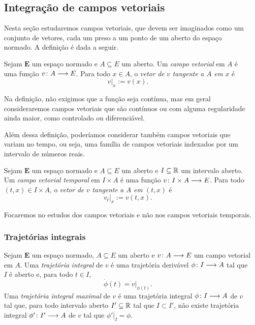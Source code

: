 \subsection{Integração de campos vetoriais}

Nesta seção estudaremos campos vetoriais, que devem ser imaginados como um conjunto de vetores, cada um preso a um ponto de um aberto do espaço normado. A definição é dada a seguir.

\begin{definition}
Sejam $\bm E$ um espaço normado e $A \subseteq E$ um aberto. Um \emph{campo vetorial} em $A$ é uma função $v\colon \allowbreak A \longrightarrow E$. Para todo $x \in A$, o \emph{vetor de $v$ tangente a $A$ em $x$} é
	\begin{equation*}
	v|_x := v(x).
	\end{equation*}
\end{definition}

Na definição, não exigimos que a função seja contínua, mas em geral consideraremos campos vetoriais que são contínuos ou com alguma regularidade ainda maior, como controlado ou diferenciável.


Além dessa definição, poderíamos considerar também campos vetoriais que variam no tempo, ou seja, uma família de campos vetoriais indexados por um intervalo de números reais.

\begin{definition}
Sejam $\bm E$ um espaço normado e $A \subseteq E$ um aberto e $I \subseteq \mathbb{R}$ um intervalo aberto. Um \emph{campo vetorial temporal} em $I \times A$ é uma função $v\colon \allowbreak I \times A \longrightarrow E$. Para todo $(t,x) \in I \times A$, o \emph{vetor de $v$ tangente a $A$ em $(t,x)$} é
	\begin{equation*}
	v_t|_x := v(t,x).
	\end{equation*}
\end{definition}

Focaremos no estudos dos campos vetoriais e não nos campos vetoriais temporais.


\subsubsection{Trajetórias integrais}

\begin{definition}
Sejam $\bm E$ um espaço normado, $A \subseteq E$ um aberto e $v\colon \allowbreak A \longrightarrow E$ um campo vetorial em $A$. Uma \emph{trajetória integral} de $v$ é uma trajetória derivável $\phi\colon \allowbreak I \longrightarrow A$ tal que $I$ é aberto e, para todo $t \in I$,
	\begin{equation*}
	\dot \phi(t) = v|_{\phi(t)}.
	\end{equation*}
Uma \emph{trajetória integral maximal} de $v$ é uma trajetória integral $\phi\colon \allowbreak I \longrightarrow A$ de $v$ tal que, para todo intervalo aberto $I' \subseteq \mathbb{R}$ tal que $I \subset I'$, não existe trajetória integral $\phi'\colon \allowbreak I' \longrightarrow A$ de $v$ tal que $\phi'|_{I} = \phi$.%
\end{definition}

